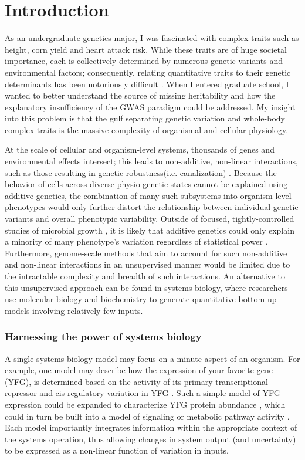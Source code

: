 
\chapter{Introduction\label{ch:intro}}

As an undergraduate genetics major, I was fascinated with complex traits such as height, corn yield and heart attack risk. While these traits are of huge societal importance, each is collectively determined by numerous genetic variants and environmental factors; consequently, relating quantitative traits to their genetic determinants has been notoriously difficult \cite{Manolio:2009jp}. When I entered graduate school, I wanted to better understand the source of missing heritability and how the explanatory insufficiency of the GWAS paradigm could be addressed. My insight into this problem is that the gulf separating genetic variation and whole-body complex traits is the massive complexity of organismal and cellular physiology.

At the scale of cellular and organism-level systems, thousands of genes and environmental effects intersect; this leads to non-additive, non-linear interactions, such as those resulting in genetic robustness(i.e. canalization) \cite{Waddington:1942wy, Szappanos:2011gu}. Because the behavior of cells across diverse physio-genetic states cannot be explained using additive genetics, the combination of many such subsystems into organism-level phenotypes would only further distort the relationship between individual genetic variants and overall phenotypic variability. Outside of focused, tightly-controlled studies of microbial growth \cite{Bloom:2013bq}, it is likely that additive genetics could only explain a minority of many phenotype's variation regardless of statistical power \cite{Weedon:2008gc,WellcomeTrustCaseControlConsortium:2007do}. Furthermore, genome-scale methods that aim to account for such non-additive and non-linear interactions in an unsupervised manner would be limited due to the intractable complexity and breadth of such interactions. An alternative to this unsupervised approach can be found in systems biology, where researchers use molecular biology and biochemistry to generate quantitative bottom-up models involving relatively few inputs.

\subsection{Harnessing the power of systems biology}

A single systems biology model may focus on a minute aspect of an organism. For example, one model may describe how the expression of your favorite gene (YFG), is determined based on the activity of its primary transcriptional repressor and cis-regulatory variation in YFG \cite{Nuzhdin:2012ii}. Such a simple model of YFG expression could be expanded to characterize YFG protein abundance \cite{Jovanovic:2015hp}, which could in turn be built into a model of signaling or metabolic pathway activity \cite{Neves:2002bk, Chassagnole:2002ty}.  Each model importantly integrates information within the appropriate context of the systems operation, thus allowing changes in system output (and uncertainty) to be expressed as a non-linear function of variation in inputs.

